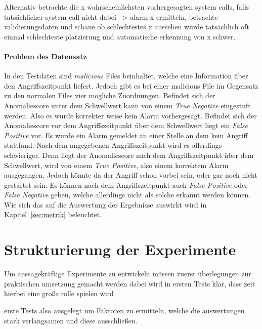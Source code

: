         Alternativ betrachte die x wahrscheinlichsten vorhergesagten system calls, falls tatsächlicher system call nicht dabei --> alarm
        x ermitteln, betrachte validierungsdaten und schaue ob schlechtestes x aussehen würde
        tatsächlich oft einmal schlechteste platzierung und automatische erkennung von x schwer.

        \paragraph{Problem des Datensatz}

            In den Testdaten sind \textit{malicious}  Files beinhaltet, welche eine Information über den Angriffszeitpunkt liefert. 
            Jedoch gibt es bei einer malicious File im Gegensatz zu den normalen Files  vier mögliche Zuordnungen.
            Befindet sich der Anomaliescore unter dem Schwellwert kann von einem \textit{True Negative} eingestuft werden.
            Also es wurde korrekter weise kein Alarm vorhergesagt.
            Befindet sich der Anomaliescore vor dem Angriffszeitpunkt über dem Schwellwert liegt ein \textit{False Positive} vor.
            Es wurde ein Alarm gemeldet an einer Stelle an dem kein Angriff stattfand.
            Nach dem angegebenen Angriffszeitpunkt wird es allerdings schwieriger.
            Denn liegt der Anomaliescore nach dem Angriffszeitpunkt über dem Schwellwert, wird von einem \textit{True Positive}, also einem korrektem Alarm ausgegangen.
            Jedoch könnte da der Angriff schon vorbei sein, oder gar noch nicht gestartet sein.
            Es können nach dem Angriffszeitpunkt auch \textit{False Positive} oder \textit{False Negative} geben, welche allerdings nicht als solche erkannt werden können.
            Wie sich das auf die Auswertung der Ergebnisse auswirkt wird in Kapitel~\ref{sec:metrik} beleuchtet.

\section{Strukturierung der Experimente}
    Um aussagekräftige Experimente zu entwickeln müssen zuerst 
    überlegungen zur praktischen umsetzung gemacht werden
    dabei wird in ersten Tests klar, dass zeit hierbei eine große rolle spielen wird

    erste Tests also ausgelegt um Faktoren zu ermitteln, welche die auswertungen stark verlangsamen
    und diese ausschließen.

